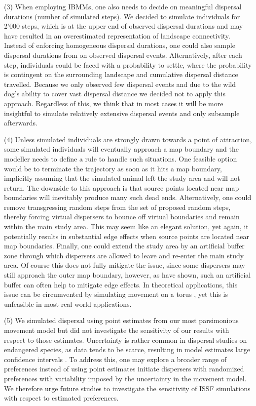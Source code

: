 \documentclass[abstract=on,10pt,a4paper,bibliography=totocnumbered]{article}
\begin{document}
(3) When employing IBMMs, one also needs to decide on meaningful dispersal
durations (number of simulated steps). We decided to simulate individuals for
2'000 steps, which is at the upper end of observed dispersal durations and may
have resulted in an overestimated representation of landscape connectivity.
Instead of enforcing homogeneous dispersal durations, one could also sample
dispersal durations from on observed dispersal events. Alternatively, after each
step, individuals could be faced with a probability to settle, where the
probability is contingent on the surrounding landscape and cumulative dispersal
distance travelled. Because we only observed few dispersal events and due to the
wild dog's ability to cover vast dispersal distance \citep{DaviesMostert.2012,
Masenga.2016, Cozzi.2020} we decided not to apply this approach. Regardless of
this, we think that in most cases it will be more insightful to simulate
relatively extensive dispersal events and only subsample afterwards.

(4) Unless simulated individuals are strongly drawn towards a point of
attraction, some simulated individuals will eventually approach a map boundary
and the modeller needs to define a rule to handle such situations. One feasible
option would be to terminate the trajectory as soon as it hits a map boundary,
implicitly assuming that the simulated animal left the study area and will not
return. The downside to this approach is that source points located near map
boundaries will inevitably produce many such dead ends. Alternatively, one could
remove transgressing random steps from the set of proposed random steps, thereby
forcing virtual dispersers to bounce off virtual boundaries and remain within
the main study area. This may seem like an elegant solution, yet again, it
potentially results in substantial edge effects when source points are located
near map boundaries. Finally, one could extend the study area by an artificial
buffer zone through which dispersers are allowed to leave and re-enter the main
study area. Of course this does not fully mitigate the issue, since some
dispersers may still approach the outer map boundary, however, as
\cite{Koen.2010} have shown, such an artificial buffer can often help to
mitigate edge effects. In theoretical applications, this issue can be
circumvented by simulating movement on a torus \citep{Hodel.2021b}, yet this is
unfeasible in most real world applications.

(5) We simulated dispersal using point estimates from our most parsimonious
movement model but did not investigate the sensitivity of our results with
respect to those estimates. Uncertainty is rather common in dispersal studies on
endangered species, as data tends to be scarce, resulting in model estimates
large confidence intervals \citep{Wiegand.2003, KramerSchadt.2007}. To address
this, one may explore a broader range of preferences instead of using point
estimates initiate dispersers with randomized preferences with variability
imposed by the uncertainty in the movement model. We therefore urge future
studies to investigate the sensitivity of ISSF simulations with respect to
estimated preferences.
\end{document}
